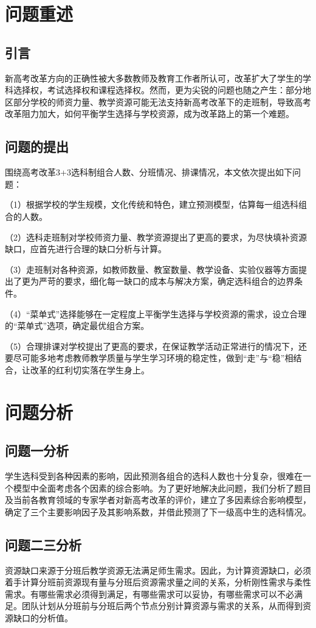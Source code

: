 \documentclass[bwprint]{cumcmthesis}
\begin{document}
\section{问题重述}
\subsection{引言}
新高考改革方向的正确性被大多数教师及教育工作者所认可，改革扩大了学生的学科选择权，考试选择权和课程选择权。\cite{杨德军2017基于新高考的普通高中学生模拟选课调查及分析}然而，更为尖锐的问题也随之产生：部分地区部分学校的师资力量、教学资源可能无法支持新高考改革下的走班制，导致高考改革阻力加大，如何平衡学生选择与学校资源，成为改革路上的第一个难题。
\subsection{问题的提出}
围绕高考改革3+3选科制组合人数、分班情况、排课情况，本文依次提出如下问题：

（1）根据学校的学生规模，文化传统和特色，建立预测模型，估算每一组选科组合的人数。

（2）选科走班制对学校师资力量、教学资源提出了更高的要求，为尽快填补资源缺口，应首先进行合理的缺口分析与计算。

（3）走班制对各种资源，如教师数量、教室数量、教学设备、实验仪器等方面提出了更为严苛的要求，细化每一缺口的成本与解决方案，确定选科组合的边界条件。

（4）“菜单式”选择能够在一定程度上平衡学生选择与学校资源的需求，设立合理的“菜单式”选项，确定最优组合方案。

（5）合理排课对学校提出了更高的要求，在保证教学活动正常进行的情况下，还要尽可能多地考虑教师教学质量与学生学习环境的稳定性，做到“走”与“稳”相结合，让改革的红利切实落在学生身上。


\section{问题分析}
\subsection{问题一分析}
学生选科受到各种因素的影响，因此预测各组合的选科人数也十分复杂，很难在一个模型中全面考虑各个因素的综合影响。为了更好地解决此问题，我们分析了题目及当前各教育领域的专家学者对新高考改革的评价，建立了多因素综合影响模型，确定了三个主要影响因子及其影响系数，并借此预测了下一级高中生的选科情况。
\subsection{问题二三分析}
资源缺口来源于分班后教学资源无法满足师生需求。因此，为计算资源缺口，必须着手计算分班前资源现有量与分班后资源需求量之间的关系，分析刚性需求与柔性需求。有哪些需求必须得到满足，有哪些需求可以妥协，有哪些需求可以不必满足。团队计划从分班前与分班后两个节点分别计算资源与需求的关系，从而得到资源缺口的分析值。
\end{document}
